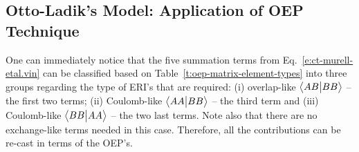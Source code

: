 \documentclass[aip,jcp,amsmath,amssymb,reprint,floatfix]{revtex4-1}
\begin{document}
\subsection{\label{ss:3.3.OEP} Otto-Ladik's Model: Application of OEP Technique}

One can immediately notice that the five summation terms
from Eq.~\eqref{e:ct-murell-etal.vin} can be classified 
based on Table~\ref{t:oep-matrix-element-types} 
into three groups
regarding the type of ERI's that are required:
(i) overlap\hyp{}like $\bigl\langle {AB} \bigl\lvert {BB} \bigr\rangle$ -- the first two terms;
(ii) Coulomb\hyp{}like $\bigl\langle {AA} \bigl\lvert {BB} \bigr\rangle$ -- the third term and
(iii)  Coulomb\hyp{}like $\bigl\langle {BB} \bigl\lvert {AA} \bigr\rangle$ -- the two last terms. 
Note also that there are no exchange\hyp{}like terms needed in this case.
Therefore, all the contributions can be re\hyp{}cast in terms of the OEP's.
\end{document}
